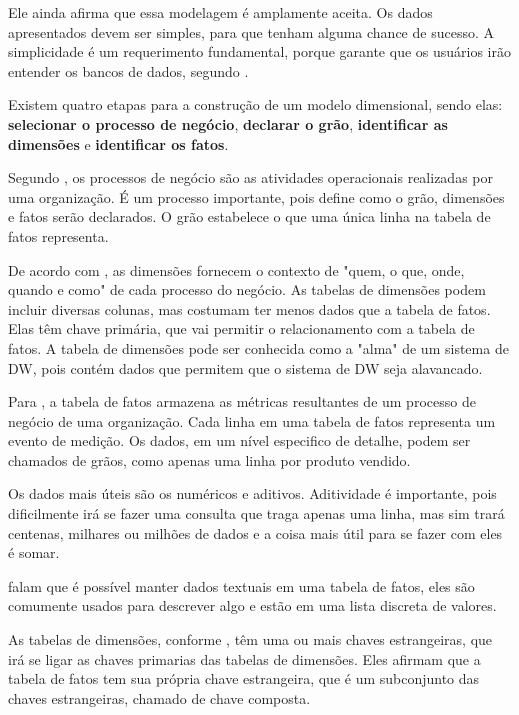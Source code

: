 Ele ainda afirma que essa modelagem é amplamente aceita. Os dados apresentados devem ser simples, para que tenham alguma chance de sucesso. A simplicidade é um requerimento fundamental, porque garante que os usuários irão entender os bancos de dados, segundo .

Existem quatro etapas para a construção de um modelo dimensional, sendo elas: \textbf{selecionar o processo de negócio}, \textbf{declarar o grão}, \textbf{identificar as dimensões} e \textbf{identificar os fatos}. 

Segundo , os processos de negócio são as atividades operacionais realizadas por uma organização. É um processo importante, pois define como o grão, dimensões e fatos serão declarados. O grão estabelece o que uma única linha na tabela de fatos representa.

De acordo com , as dimensões fornecem o contexto de "quem, o que, onde, quando e como" de cada processo do negócio. As tabelas de dimensões podem incluir diversas colunas, mas costumam ter menos dados que a tabela de fatos. Elas têm chave primária, que vai permitir o relacionamento com a tabela de fatos.
A tabela de dimensões pode ser conhecida como a "alma" de um sistema de DW, pois contém dados que permitem que o sistema de DW seja alavancado.

Para , a tabela de fatos armazena as métricas resultantes de um processo de negócio de uma organização. Cada linha em uma tabela de fatos representa um evento de medição. Os dados, em um nível especifico de detalhe, podem ser chamados de grãos, como apenas uma linha por produto vendido.

Os dados mais úteis são os numéricos e aditivos. Aditividade é importante, pois dificilmente irá se fazer uma consulta que traga apenas uma linha, mas sim trará centenas, milhares ou milhões de dados e a coisa mais útil para se fazer com eles é somar.

 falam que é possível manter dados textuais em uma tabela de fatos, eles são comumente usados para descrever algo e estão em uma lista discreta de valores. 

As tabelas de dimensões, conforme , têm uma ou mais chaves estrangeiras, que irá se ligar as chaves primarias das tabelas de dimensões. Eles afirmam que a tabela de fatos tem sua própria chave estrangeira, que é um subconjunto das chaves estrangeiras, chamado de chave composta. 

